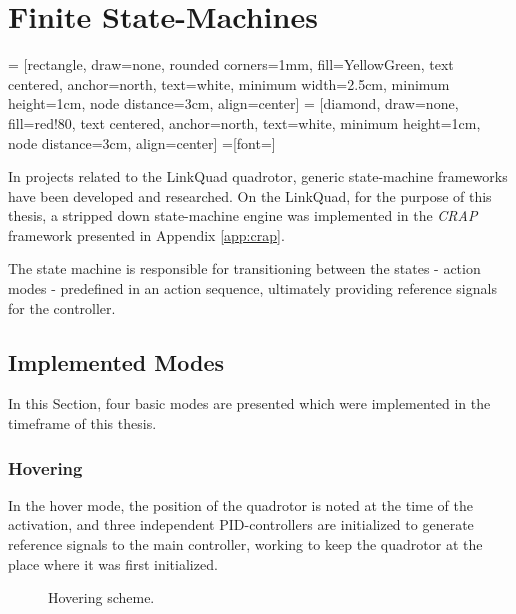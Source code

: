 \chapter{Finite State-Machines}
\label{cha:logic}
     = [rectangle, draw=none, rounded corners=1mm, fill=YellowGreen,
                    text centered, anchor=north, text=white, minimum width=2.5cm, minimum height=1cm, node distance=3cm, align=center]
     = [diamond, draw=none, fill=red!80,
                    text centered, anchor=north, text=white, minimum height=1cm, node distance=3cm, align=center]
    =[font=\scriptsize]

    In projects related to the LinkQuad quadrotor, generic state-machine
    frameworks have been developed and researched\citep{Merz06,Wzorek11}.
    On the LinkQuad, for the purpose of this thesis, a stripped down state-machine engine
    was implemented in the \textit{CRAP} framework presented in Appendix \ref{app:crap}.

    The state machine is responsible for transitioning between the
    states - action modes - predefined in an action sequence, ultimately
    providing reference signals for the controller.

    \section{Implemented Modes}
        In this Section, four basic modes are presented which were implemented
        in the timeframe of this thesis.

        \subsection{Hovering}
            In the hover mode, the position of the quadrotor is noted at
            the time of the activation, and three independent PID-controllers
            are initialized to generate reference signals to the main controller,
            working to keep the quadrotor at the place where it was first initialized.
            \begin{figure}[h]
                \noindent{}
                \caption{Hovering scheme.}
                \label{fig:logic:hoverscheme}
            \end{figure}

